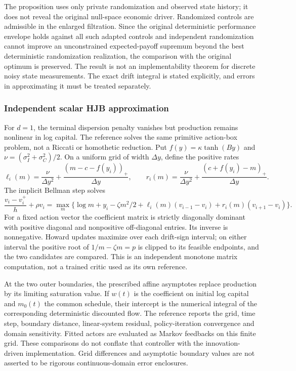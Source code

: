The proposition uses only private randomization and observed state history; it does not reveal the original null-space economic driver. Randomized controls are admissible in the enlarged filtration. Since the original deterministic performance envelope holds against all such adapted controls and independent randomization cannot improve an unconstrained expected-payoff supremum beyond the best deterministic randomization realization, the comparison with the original optimum is preserved. The result is not an implementability theorem for discrete noisy state measurements. The exact drift integral is stated explicitly, and errors in approximating it must be treated separately.

\subsubsection{Independent scalar HJB approximation}
For $d=1$, the terminal dispersion penalty vanishes but production remains nonlinear in log capital. The reference solves the same primitive action-box problem, not a Riccati or homothetic reduction. Put $f(y)=\kappa\tanh(By)$ and $\nu=(\sigma_I^2+\sigma_C^2)/2$. On a uniform grid of width $\Delta y$, define the positive rates
\[
 \ell_i(m)=\frac\nu{\Delta y^2}+\frac{(m-c-f(y_i))_+}{\Delta y},
 \qquad r_i(m)=\frac\nu{\Delta y^2}+\frac{(c+f(y_i)-m)_+}{\Delta y}.
\]
The implicit Bellman step solves
\[
 \frac{v_i-v_i^+}{h}+\rho v_i
 =\max_m\{\log m+y_i-\zeta m^2/2
       +\ell_i(m)(v_{i-1}-v_i)+r_i(m)(v_{i+1}-v_i)\}.
\]
For a fixed action vector the coefficient matrix is strictly diagonally dominant with positive diagonal and nonpositive off-diagonal entries. Its inverse is nonnegative. Howard updates maximize over each drift-sign interval; on either interval the positive root of $1/m-\zeta m=p$ is clipped to its feasible endpoints, and the two candidates are compared. This is an independent monotone matrix computation, not a trained critic used as its own reference.

At the two outer boundaries, the prescribed affine asymptotes replace production by its limiting saturation value. If $w(t)$ is the coefficient on initial log capital and $m_0(t)$ the common schedule, their intercept is the numerical integral of the corresponding deterministic discounted flow. The reference reports the grid, time step, boundary distance, linear-system residual, policy-iteration convergence and domain sensitivity. Fitted actors are evaluated as Markov feedbacks on this finite grid. These comparisons do not conflate that controller with the innovation-driven implementation. Grid differences and asymptotic boundary values are not asserted to be rigorous continuous-domain error enclosures.


